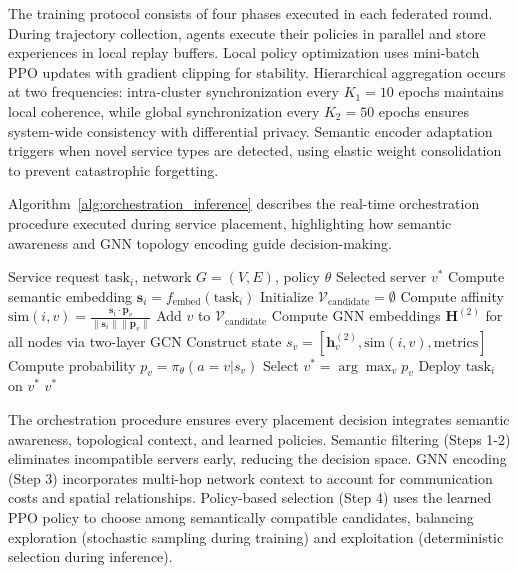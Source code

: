 \documentclass[conference]{IEEEtran}
\begin{document}
	The training protocol consists of four phases executed in each federated round. During trajectory collection, agents execute their policies in parallel and store experiences in local replay buffers. Local policy optimization uses mini-batch PPO updates with gradient clipping for stability. Hierarchical aggregation occurs at two frequencies: intra-cluster synchronization every $K_1=10$ epochs maintains local coherence, while global synchronization every $K_2=50$ epochs ensures system-wide consistency with differential privacy. Semantic encoder adaptation triggers when novel service types are detected, using elastic weight consolidation to prevent catastrophic forgetting.
	
	Algorithm~\ref{alg:orchestration_inference} describes the real-time orchestration procedure executed during service placement, highlighting how semantic awareness and GNN topology encoding guide decision-making.
	
	\begin{algorithm}[t]
		\caption{FedSemGNN Orchestration (Inference)}
		\label{alg:orchestration_inference}
		\begin{algorithmic}[1]
			\REQUIRE Service request $\text{task}_i$, network $G=(V,E)$, policy $\theta$
			\ENSURE Selected server $v^*$
			\STATE Compute semantic embedding $\mathbf{s}_i = f_{\text{embed}}(\text{task}_i)$
			\STATE Initialize $\mathcal{V}_{\text{candidate}} = \emptyset$
			\STATE Compute affinity $\text{sim}(i,v) = \frac{\mathbf{s}_i \cdot \mathbf{p}_v}{\|\mathbf{s}_i\| \|\mathbf{p}_v\|}$
			\STATE Add $v$ to $\mathcal{V}_{\text{candidate}}$
			\ENDIF
			\ENDFOR
			\STATE
			\STATE Compute GNN embeddings $\mathbf{H}^{(2)}$ for all nodes via two-layer GCN
			\STATE Construct state $s_v = [\mathbf{h}_v^{(2)}, \text{sim}(i,v), \text{metrics}]$
			\STATE Compute probability $p_v = \pi_\theta(a=v | s_v)$
			\ENDFOR
			\STATE
			\STATE Select $v^* = \arg\max_v p_v$
			\STATE Deploy $\text{task}_i$ on $v^*$
			\RETURN $v^*$
		\end{algorithmic}
	\end{algorithm}
	
	The orchestration procedure ensures every placement decision integrates semantic awareness, topological context, and learned policies. Semantic filtering (Steps 1-2) eliminates incompatible servers early, reducing the decision space. GNN encoding (Step 3) incorporates multi-hop network context to account for communication costs and spatial relationships. Policy-based selection (Step 4) uses the learned PPO policy to choose among semantically compatible candidates, balancing exploration (stochastic sampling during training) and exploitation (deterministic selection during inference).
	
\end{document}

